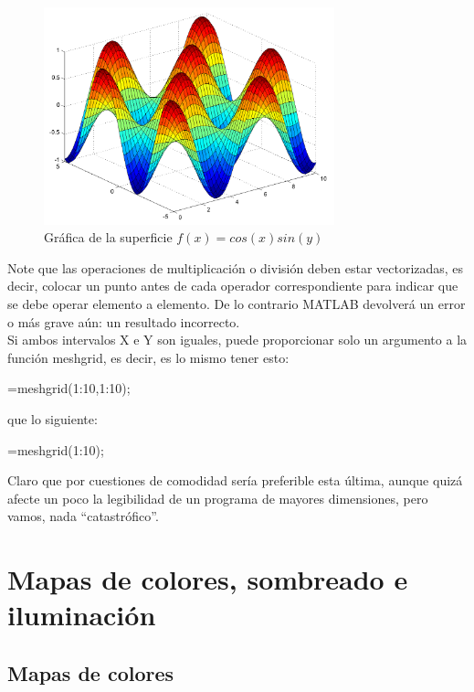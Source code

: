 \begin{figure}[htbp]
    \centering
    \includegraphics[width=0.75\textwidth]{images/ch4/img_4_8.png}
    \caption{Gráfica de la superficie $f(x)=cos(x) sin(y)$}
    \label{fig:img_4_8}
\end{figure}

Note que las operaciones de multiplicación o división deben estar
vectorizadas, es decir, colocar un punto antes de cada operador
correspondiente para indicar que se debe operar elemento a elemento. De
lo contrario MATLAB devolverá un error o más grave aún: un resultado
incorrecto. \\

Si ambos intervalos X e Y son iguales, puede proporcionar solo un
argumento a la función meshgrid, es decir, es lo mismo tener esto:

\begin{matlab}
[X,Y]=meshgrid(1:10,1:10);
\end{matlab}

que lo siguiente:

\begin{matlab}
[X,Y]=meshgrid(1:10);
\end{matlab}

Claro que por cuestiones de comodidad sería preferible esta última,
aunque quizá afecte un poco la legibilidad de un programa de mayores
dimensiones, pero vamos, nada ``catastrófico''.

\section{Mapas de colores, sombreado e iluminación}

\subsection{Mapas de colores}

